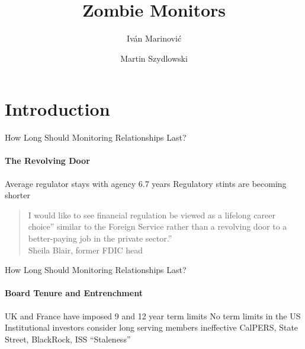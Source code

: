 \documentclass[usenames,dvipsnames]{beamer}
\newcommand{\bo}{\begin{outline}}
\newcommand{\eo}{\end{outline}}
\begin{document}
\title[Reputation and ]{Zombie Monitors}

\author{Iv\'an Marinovi\'c \and Martin Szydlowski }



%

\begin{frame}
  \titlepage
\end{frame}

\section{Introduction}

\begin{frame}{How Long Should Monitoring Relationships Last?}
\framesubtitle{The Revolving Door}

\bo
\1 Average regulator stays with agency 6.7 years
\1 Regulatory stints are becoming shorter
\eo


\begin{quote}

I would like to see financial regulation be viewed as a lifelong career choice'' similar to the Foreign Service rather than a revolving door to a better-paying job in the private sector.''
        \\
        \hfill Sheila Blair, former FDIC head
\end{quote}
        

\end{frame}

\begin{frame}{How Long Should Monitoring Relationships Last?}
\framesubtitle{Board Tenure and Entrenchment}
\bo 
\1 UK and France have imposed 9 and 12 year term limits
\1 No term limits in the US
\1 Institutional investors consider long serving members ineffective
\2 CalPERS, State Street, BlackRock, ISS 
\2 ``Staleness''
\eo
\end{frame}
\end{document}
